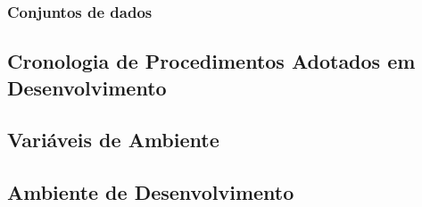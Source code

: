 \subsubsection{Conjuntos de dados}
\label{subsubsec:dados_ocr}


\subsection{Cronologia de Procedimentos Adotados em Desenvolvimento}


\subsection{Variáveis de Ambiente}


\subsection{Ambiente de Desenvolvimento}
